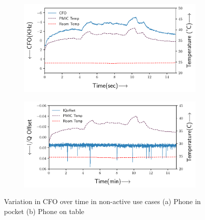 \begin{figure}
    \centering
    \begin{subfigure}[b]{1\linewidth}
       \includegraphics[width=1\linewidth]{plots/exert_cfo.pdf}
       \caption{}
       \label{fig:exertcfo} 
    \end{subfigure}
    
    \begin{subfigure}[b]{1\linewidth}
       \includegraphics[width=1\linewidth]{plots/exert_iq.pdf}
       \caption{}
       \label{fig:exertiq}
    \end{subfigure}
    
    \caption[Two numerical solutions]{Variation in CFO over time in non-active use cases (a) Phone in pocket (b) Phone on table}
\end{figure}

